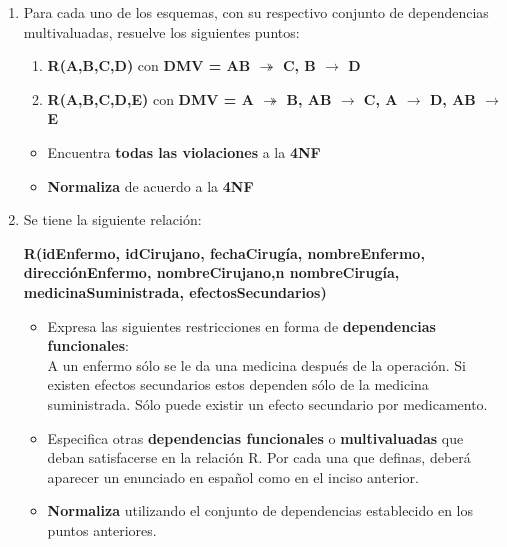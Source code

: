 \documentclass{article}
\begin{document}
\begin{enumerate}
    
    	\item Para  cada  uno  de  los  esquemas,  con  su  respectivo  conjunto  de  dependencias  multivaluadas, resuelve los siguientes puntos:
    	\begin{enumerate}
    		\item \textbf{R(A,B,C,D)} con \textbf{DMV = {AB $\twoheadrightarrow$ C, B $\rightarrow$ D}}
    		\item \textbf{R(A,B,C,D,E)} con \textbf{DMV = { A $\twoheadrightarrow$ B, AB $\rightarrow$ C, A $\rightarrow$ D, AB $\rightarrow$ E}}
    	\end{enumerate}
    
    \begin{itemize}
    	\item Encuentra \textbf{todas las violaciones} a la \textbf{4NF}
    	\item \textbf{Normaliza} de acuerdo a la \textbf{4NF}
    \end{itemize}
    
    	\item Se tiene la siguiente relación:   	
    	\begin{center}
    		 \textbf{R(idEnfermo, idCirujano, fechaCirugía, nombreEnfermo, direcciónEnfermo, nombreCirujano,n nombreCirugía, medicinaSuministrada, efectosSecundarios)}
    	\end{center}	 
    	
    	\begin{itemize}
    	\item Expresa las siguientes restricciones en forma de \textbf{dependencias funcionales}:\\
    	A un enfermo sólo se le da una medicina después de la operación. Si existen efectos secundarios estos dependen sólo de la medicina suministrada. Sólo puede existir un efecto secundario por medicamento.
    	\item Especifica  otras \textbf{dependencias  funcionales} o \textbf{multivaluadas} que  deban  satisfacerse  en  la relación R. Por cada una que definas, deberá aparecer un enunciado en español como en el inciso anterior.
    	\item \textbf{Normaliza} utilizando el conjunto de dependencias establecido en los puntos anteriores.
    \end{itemize}
    	
\end{enumerate}
\end{document}
